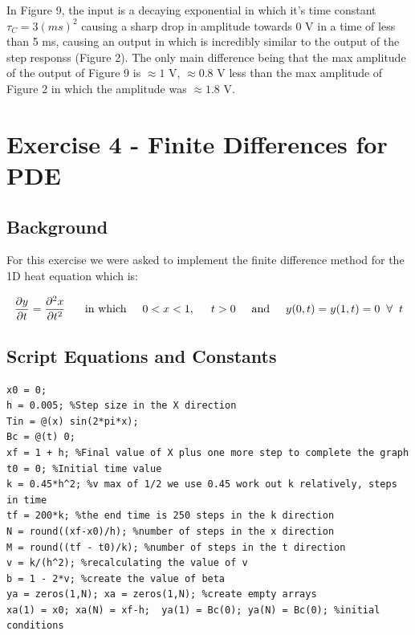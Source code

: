 \documentclass[11pt,a4paper]{article}
\begin{document}
In Figure 9, the input is a decaying exponential in which it's time constant $\tau_C = 3 (ms)^2$ causing a sharp drop in amplitude towards 0 V in a time of less than 5 ms, causing an output in which is incredibly similar to the output of the step responss (Figure 2). The only main difference being that the max amplitude of the output of Figure 9 is $\approx 1$ V, $\approx 0.8$ V less than the max amplitude of Figure 2 in which the amplitude was $\approx 1.8$ V.

\pagebreak

\section{Exercise 4 - Finite Differences for PDE}\vspace{-1mm}
\subsection{Background}

For this exercise we were asked to implement the finite difference method for the 1D heat equation which is:

\[\frac{\partial y}{\partial t} = \frac{\partial^2 x}{\partial t^2}\ \hspace{5mm} \text{in which} \hspace{5mm} 0 < x < 1, \hspace{5mm} t > 0 \hspace{5mm} \text{and} \hspace{5mm} y(0,t) = y(1,t) = 0 \hspace{2mm} \forall \hspace{2mm} t\]

\subsection{Script Equations and Constants}

\begin{verbatim}
x0 = 0;
h = 0.005; %Step size in the X direction
Tin = @(x) sin(2*pi*x);
Bc = @(t) 0;
xf = 1 + h; %Final value of X plus one more step to complete the graph
t0 = 0; %Initial time value
k = 0.45*h^2; %v max of 1/2 we use 0.45 work out k relatively, steps in time
tf = 200*k; %the end time is 250 steps in the k direction
N = round((xf-x0)/h); %number of steps in the x direction
M = round((tf - t0)/k); %number of steps in the t direction
v = k/(h^2); %recalculating the value of v
b = 1 - 2*v; %create the value of beta
ya = zeros(1,N); xa = zeros(1,N); %create empty arrays
xa(1) = x0; xa(N) = xf-h;  ya(1) = Bc(0); ya(N) = Bc(0); %initial conditions
\end{verbatim}
\end{document}
